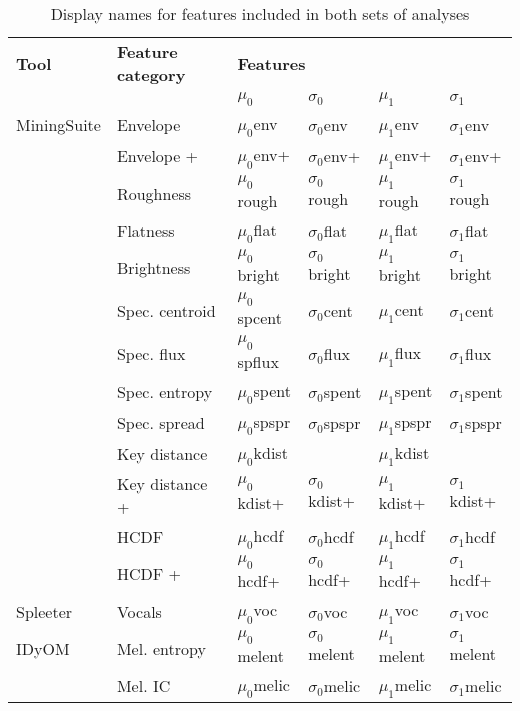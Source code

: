\begin{table}[h]
\centering
\small

\begin{threeparttable}
\caption{Display names for features included in both sets of analyses}
\label{tab:exp-1}

\begin{tabular*}{\textwidth}{@{\extracolsep{\fill}}llllll@{}}
\toprule
\textbf{Tool} & \textbf{Feature category} & \multicolumn{4}{l}{\textbf{Features}}\\ 
\cmidrule{3-6}

& & \textbf{$\mu_0$} & \textbf{$\sigma_0$} & \textbf{$\mu_1$} & \textbf{$\sigma_1$} \\ 
\midrule

MiningSuite & Envelope       & $\mu_0$env    & $\sigma_0$env    & $\mu_1$env    & $\sigma_1$env    \\
            & Envelope +     & $\mu_0$env+   & $\sigma_0$env+   & $\mu_1$env+   & $\sigma_1$env+   \\
            & Roughness      & $\mu_0$rough  & $\sigma_0$rough  & $\mu_1$rough  & $\sigma_1$rough  \\
            & Flatness       & $\mu_0$flat   & $\sigma_0$flat   & $\mu_1$flat   & $\sigma_1$flat   \\
            & Brightness     & $\mu_0$bright & $\sigma_0$bright & $\mu_1$bright & $\sigma_1$bright \\
            & Spec. centroid & $\mu_0$spcent & $\sigma_0$cent   & $\mu_1$cent   & $\sigma_1$cent   \\
            & Spec. flux     & $\mu_0$spflux & $\sigma_0$flux   & $\mu_1$flux   & $\sigma_1$flux   \\
            & Spec. entropy  & $\mu_0$spent  & $\sigma_0$spent  & $\mu_1$spent  & $\sigma_1$spent  \\
            & Spec. spread   & $\mu_0$spspr  & $\sigma_0$spspr  & $\mu_1$spspr  & $\sigma_1$spspr  \\
            & Key distance   & $\mu_0$kdist  &                  & $\mu_1$kdist  &                  \\
            & Key distance + & $\mu_0$kdist+ & $\sigma_0$kdist+ & $\mu_1$kdist+ & $\sigma_1$kdist+ \\
            & HCDF           & $\mu_0$hcdf   & $\sigma_0$hcdf   & $\mu_1$hcdf   & $\sigma_1$hcdf   \\
            & HCDF +         & $\mu_0$hcdf+  & $\sigma_0$hcdf+  & $\mu_1$hcdf+  & $\sigma_1$hcdf+  \\
Spleeter    & Vocals         & $\mu_0$voc    & $\sigma_0$voc    & $\mu_1$voc    & $\sigma_1$voc    \\
IDyOM       & Mel. entropy   & $\mu_0$melent & $\sigma_0$melent & $\mu_1$melent & $\sigma_1$melent \\
            & Mel. IC        & $\mu_0$melic  & $\sigma_0$melic  & $\mu_1$melic  & $\sigma_1$melic  \\
\bottomrule


\end{tabular*}
\end{threeparttable}
\end{table}
